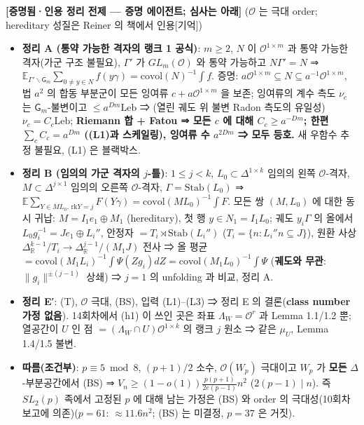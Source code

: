 \textbf{{[}증명됨·인용 정리 전제 --- 증명 에이전트; 심사는 아래{]}} (\(\mathcal O\) 는 극대 order; hereditary 성질은 Reiner 의 책에서 인용{[}기억{]})

\begin{itemize}
\tightlist
\item
  \textbf{정리 A (통약 가능한 격자의 랭크 1 공식)}: \(m\ge2\), \(N\) 이 \(\mathcal O^{1\times m}\) 과 통약 가능한 격자(가군 구조 불필요), \(\Gamma'\) 가 \(GL_m(\mathcal O)\) 와 통약 가능하고 \(N\Gamma'=N\) ⇒ \(\mathbb E_{\Gamma'\backslash\mathsf G_m}\sum_{0\ne y\in N}f(y\gamma)=\mathrm{covol}(N)^{-1}\int f\). 증명: \(a\mathcal O^{1\times m}\subseteq N\subseteq a^{-1}\mathcal O^{1\times m}\), 법 \(a^2\) 의 합동 부분군이 모든 잉여류 \(c+a\mathcal O^{1\times m}\) 을 보존; 잉여류의 계수 측도 \(\nu_c\) 는 \(\mathsf G_m\)-불변이고 \(\le a^{Dm}\mathrm{Leb}\) ⇒ (열린 궤도 위 불변 Radon 측도의 유일성) \(\nu_c=C_c\mathrm{Leb}\); \textbf{Riemann 합 + Fatou ⇒ 모든 \(c\) 에 대해 \(C_c\ge a^{-Dm}\); 한편 \(\sum_cC_c=a^{Dm}\) ((L1)과 스케일링), 잉여류 수 \(a^{2Dm}\) ⇒ 모두 등호.} 새 우함수 추정 불필요, (L1) 은 블랙박스.
\item
  \textbf{정리 B (임의의 가군 격자의 \(j\)-틀)}: \(1\le j<k\), \(L_0\subset\Delta^{1\times k}\) 임의의 왼쪽 \(\mathcal O\)-격자, \(M\subset\Delta^{j\times1}\) 임의의 오른쪽 \(\mathcal O\)-격자, \(\Gamma=\mathrm{Stab}(L_0)\) ⇒ \(\mathbb E\sum_{Y\in ML_0,\,\mathrm{rk}Y=j}F(Y\gamma)=\mathrm{covol}(ML_0)^{-1}\int F\). 모든 쌍 \((M,L_0)\) 에 대한 동시 귀납: \(M=I_1e_1\oplus M_1\) (hereditary), 첫 행 \(y\in N_1=I_1L_0\); 궤도 \(y_i\Gamma\) 의 올에서 \(L_0g_i^{-1}=Je_1\oplus L_i''\), 안정자 \(=T_i\rtimes\mathrm{Stab}(L_i'')\) (\(T_i=\{n:L_i''n\subseteq J\}\)), 원환 사상 \(\Delta_\mathbb R^{k-1}/T_i\to\Delta_\mathbb R^{j-1}/(M_1J)\) 전사 ⇒ 올 평균 \(=\mathrm{covol}(M_1L_i)^{-1}\int\Psi(Zg_i)dZ=\mathrm{covol}(M_1L_0)^{-1}\int\Psi\) (\textbf{궤도와 무관}: \(\|g_i\|^{\pm(j-1)}\) 상쇄) ⇒ \(j=1\) 의 unfolding 과 비교, 정리 A.
\item
  \textbf{정리 E′}: (T), \(\mathcal O\) 극대, (BS), 입력 (L1)--(L3) ⇒ 정리 E 의 결론(\textbf{class number 가정 없음}). 14회차에서 (h1) 이 쓰인 곳은 좌표 \(\Lambda_W=\mathcal O^r\) 과 Lemma 1.1/1.2 뿐; 열공간이 \(U\) 인 점 \(=(\Lambda_W\cap U)\mathcal O^{1\times k}\) 의 랭크 \(j\) 원소 ⇒ 같은 \(\mu_U\), Lemma 1.4/1.5 불변.
\item
  \textbf{따름(조건부)}: \(p\equiv5\bmod8\), \((p+1)/2\) 소수, \(\mathcal O(W_p)\) 극대이고 \(W_p\) 가 \textbf{모든} \(\Delta\)-부분공간에서 (BS) ⇒ \(V_n\ge(1-o(1))\frac{p(p+1)}{2e(p-1)}n^2\) (\(2(p-1)\mid n\)). 즉 \(SL_2(p)\) 족에서 고정된 \(p\) 에 대해 남는 가정은 (BS) 와 order 의 극대성(10회차 보고에 의존)(\(p=61\): \(\approx11.6n^2\); (BS) 는 미결정, \(p=37\) 은 거짓).

\end{itemize}
